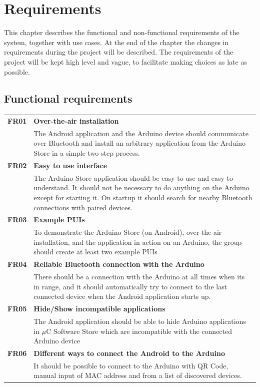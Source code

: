 \chapter{Requirements}
This chapter describes the functional and non-functional requirements of the system, together with use cases. At the end of the chapter the changes in requirements during the project will be described.
The requirements of the project will be kept high level and vague, to facilitate making choices as late as possible.

\section{Functional requirements}
	\begin{table}[H]
	\begin{tabularx}{\linewidth}{lX}

		\textbf{FR01} & \textbf{Over-the-air installation}\\
 		              & The Android application and the Arduino device should communicate over 
                        Bluetooth and install an arbitrary application from the Arduino Store in a simple two step process.\\

		\textbf{FR02} & \textbf{Easy to use interface}\\
                      & The Arduino Store application should be easy to use and easy to understand. It should not be necessary to do anything on the Arduino except for starting it. On startup it should search for nearby Bluetooth connections with paired devices.\\

 		\textbf{FR03} & \textbf{Example PUIs}\\
                      & To demonstrate the Arduino Store (on Android), over-the-air installation, and the application in action on an Arduino, the group should create at least two example PUIs \\

		\textbf{FR04} & \textbf{Reliable Bluetooth connection with the Arduino}\\
                      & There should be a connection with the Arduino at all times when its in range, and it should automatically try to connect to the last connected device when the Android application starts up.\\

        \textbf{FR05} & \textbf{Hide/Show incompatible applications}\\
                      & The Android application should be able to hide Arduino applications in $\mu$C Software Store which are incompatible with the connected Arduino device\\

        \textbf{FR06} & \textbf{Different ways to connect the Android to the Arduino}\\
                      & It should be possible to connect to the Arduino with QR Code, manual input of MAC address and from a list of discovered devices.\\

	\end{tabularx}
	\end{table}

